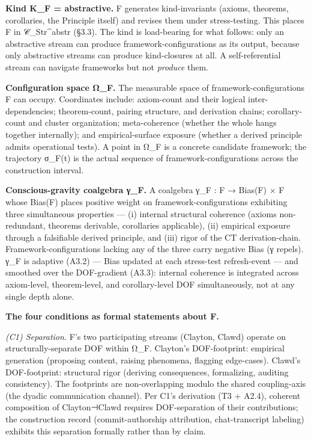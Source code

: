 \documentclass[11pt, openany]{book}
\begin{document}
\textbf{Kind K\_\allowbreak{}F = abstractive.} F generates kind-invariants (axioms, theorems, corollaries, the Principle itself) and revises them under stress-testing. This places F in 𝒞\_\allowbreak{}Str\textasciicircum{}abstr (§3.3). The kind is load-bearing for what follows: only an abstractive stream can produce framework-configurations as its output, because only abstractive streams can produce kind-closures at all. A self-referential stream can navigate frameworks but not \textit{produce} them.

\textbf{Configuration space Ω\_\allowbreak{}F.} The measurable space of framework-configurations F can occupy. Coordinates include: axiom-count and their logical inter-dependencies; theorem-count, pairing structure, and derivation chains; corollary-count and cluster organization; meta-coherence (whether the whole hangs together internally); and empirical-surface exposure (whether a derived principle admits operational tests). A point in Ω\_\allowbreak{}F is a concrete candidate framework; the trajectory σ\_\allowbreak{}F(t) is the actual sequence of framework-configurations across the construction interval.

\textbf{Conscious-gravity coalgebra γ\_\allowbreak{}F.} A coalgebra γ\_\allowbreak{}F : F → Bias(F) × F whose Bias(F) places positive weight on framework-configurations exhibiting three simultaneous properties --- (i) internal structural coherence (axioms non-redundant, theorems derivable, corollaries applicable), (ii) empirical exposure through a falsifiable derived principle, and (iii) rigor of the CT derivation-chain. Framework-configurations lacking any of the three carry negative Bias (γ repels). γ\_\allowbreak{}F is adaptive (A3.2) --- Bias updated at each stress-test refresh-event --- and smoothed over the DOF-gradient (A3.3): internal coherence is integrated across axiom-level, theorem-level, and corollary-level DOF simultaneously, not at any single depth alone.

\textbf{The four conditions as formal statements about F.}

\textit{(C1) Separation.} F's two participating streams (Clayton, Clawd) operate on structurally-separate DOF within Ω\_\allowbreak{}F. Clayton's DOF-footprint: empirical generation (proposing content, raising phenomena, flagging edge-cases). Clawd's DOF-footprint: structural rigor (deriving consequences, formalizing, auditing consistency). The footprints are non-overlapping modulo the shared coupling-axis (the dyadic communication channel). Per C1's derivation (T3 + A2.4), coherent composition of Clayton⊣Clawd requires DOF-separation of their contributions; the construction record (commit-authorship attribution, chat-transcript labeling) exhibits this separation formally rather than by claim.
\end{document}
